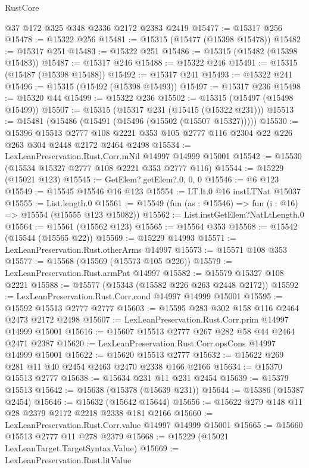 \begin{lexlean}{RustCore}
\begin{coremodule}
    @37
    @172
    @325
    @348
    @2336
    @2172
    @2383
    @2419
@15477 := @15317 @256
@15478 := @15322 @256
@15481 := @15315 (@15477 (@15398 @15478))
@15482 := @15317 @251
@15483 := @15322 @251
@15486 := @15315 (@15482 (@15398 @15483))
@15487 := @15317 @246
@15488 := @15322 @246
@15491 := @15315 (@15487 (@15398 @15488))
@15492 := @15317 @241
@15493 := @15322 @241
@15496 := @15315 (@15492 (@15398 @15493))
@15497 := @15317 @236
@15498 := @15320 @44
@15499 := @15322 @236
@15502 := @15315 (@15497 (@15498 @15499))
@15507 := @15315 (@15317 @231 (@15415 (@15322 @231)))
@15513 := @15481 (@15486 (@15491 (@15496 (@15502 (@15507 @15327)))))
@15530 := @15396
    @15513
    @2777
    @108
    @2221
    @353
    @105
    @2777
    @116
    @2304
    @22
    @226
    @263
    @304
    @2448
    @2172
    @2464
    @2498
@15534 := LexLeanPreservation.Rust.Corr.mNil @14997 @14999 @15001
@15542 := @15530 (@15534 @15327 @2777 @108 @2221 @353 @2777 @116)
@15544 := @15229 (@15021 @123)
@15545 := GetElem?.getElem?.{0, 0, 0}
@15546 := @6 @123
@15549 := @15545 @15546 @16 @123
@15554 := LT.lt.{0} @16 instLTNat @15037
@15555 := List.length.{0}
@15561 := @15549 (fun (as : @15546) => fun (i : @16) => @15554 (@15555 @123 @15082))
@15562 := List.instGetElem?NatLtLength.{0}
@15564 := @15561 (@15562 @123)
@15565 := @15564 @353
@15568 := @15542 (@15544 (@15565 @22))
@15569 := @15229 @14993
@15571 := LexLeanPreservation.Rust.otherArms @14997
@15573 := @15571 @108 @353
@15577 := @15568 (@15569 (@15573 @105 @226))
@15579 := LexLeanPreservation.Rust.armPat @14997
@15582 := @15579 @15327 @108 @2221
@15588 := @15577 (@15343 (@15582 @226 @263 @2448 @2172))
@15592 := LexLeanPreservation.Rust.Corr.cond @14997 @14999 @15001
@15595 := @15592 @15513 @2777 @2777
@15603 := @15595 @283 @302 @158 @116 @2464 @2473 @2172 @2498
@15607 := LexLeanPreservation.Rust.Corr.prim @14997 @14999 @15001
@15616 := @15607 @15513 @2777 @267 @282 @58 @44 @2464 @2471 @2387
@15620 := LexLeanPreservation.Rust.Corr.opsCons @14997 @14999 @15001
@15622 := @15620 @15513 @2777
@15632 := @15622 @269 @281 @11 @40 @2454 @2463 @2470 @2338 @166 @2166
@15634 := @15370 @15513 @2777
@15638 := @15634 @231 @11 @231 @2454
@15639 := @15379 @15513
@15642 := @15638 (@15378 (@15639 @231))
@15644 := @15386 (@15387 @2454)
@15646 := @15632 (@15642 @15644)
@15656 := @15622 @279 @148 @11 @28 @2379 @2172 @2218 @2338 @181 @2166
@15660 := LexLeanPreservation.Rust.Corr.value @14997 @14999 @15001
@15665 := @15660 @15513 @2777 @11 @278 @2379
@15668 := @15229 (@15021 LexLeanTarget.TargetSyntax.Value)
@15669 := LexLeanPreservation.Rust.litValue

\end{coremodule}
\end{lexlean}
